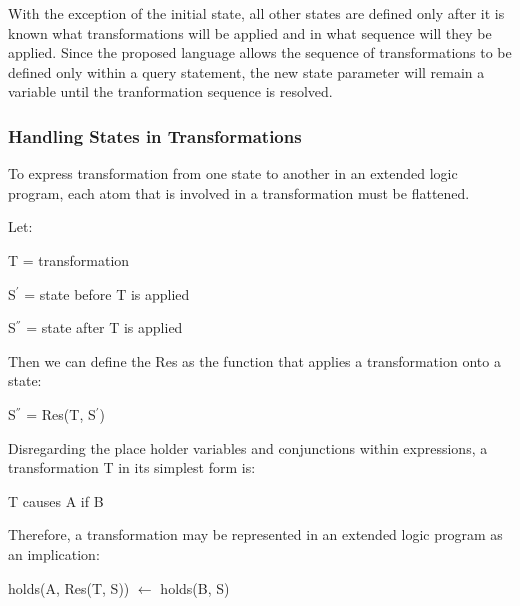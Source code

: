 \documentclass[a4paper]{article}
\begin{document}
        With the exception of the initial state, all other states are defined 
        only after it is known what transformations will be applied and in 
        what sequence will they be applied. Since the proposed language
        allows the sequence of transformations to be defined only within a
        query statement, the new state parameter will remain a variable until 
        the tranformation sequence is resolved.

      \subsubsection{Handling States in Transformations}

        To express transformation from one state to another in an extended
        logic program, each atom that is involved in a transformation must
        be flattened.

        Let:
  
        \begin{list}{}{}
          \item T = transformation
          \item S$^{'}$ = state before T is applied
          \item S$^{''}$ = state after T is applied
        \end{list}
  
        Then we can define the Res as the function that applies a 
        transformation onto a state:
  
        \begin{list}{}{}
          \item S$^{''}$ = Res(T, S$^{'}$)
        \end{list}
  
        Disregarding the place holder variables and conjunctions within
        expressions, a transformation T in its simplest form is:
  
        \begin{list}{}{}
          \item T causes A if B
        \end{list}
  
        Therefore, a transformation may be represented in an extended logic
        program as an implication:
 
        \begin{list}{}{}
          \item holds(A, Res(T, S)) $\leftarrow$ holds(B, S)
        \end{list}
\end{document}
